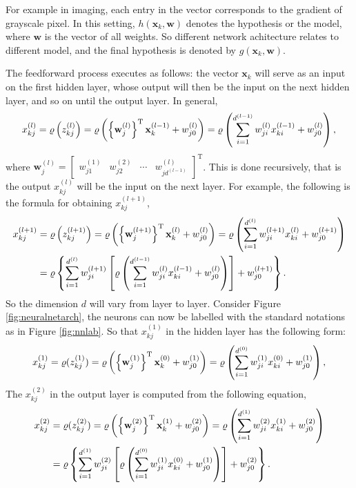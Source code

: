 For example in imaging, each entry in the vector corresponds to the gradient of grayscale pixel. In this setting, $h(\mathbf{x}_k,\mathbf{w})$ denotes the hypothesis or the model, where $\mathbf{w}$ is the vector of all weights. So different network achitecture relates to different model, and the final hypothesis is denoted by $g(\mathbf{x}_k,\mathbf{w})$. 

The feedforward process executes as follows: the vector $\mathbf{x}_k$ will serve as an input on the first hidden layer, whose output will then be the input on the next hidden layer, and so on until the output layer. In general,
$$
x_{kj}^{(l)}=\varrho\left(z_{kj}^{(l)}\right)=\varrho\left(\left\{\mathbf{w}_{j}^{(l)}\right\}^{\text{T}}\mathbf{x}_k^{(l-1)} + w_{j0}^{(l)}\right)=\varrho\left(\sum_{i=1}^{d^{(l-1)}}w_{ji}^{(l)}x_{ki}^{(l-1)}+w_{j0}^{(l)}\right),
$$
where $\mathbf{w}_{j}^{(l)}=\left[\begin{array}{cccc}w_{j1}^{(1)}&w_{j2}^{(2)}&\cdots&w_{jd^{(l-1)}}^{(l)}\end{array}\right]^{\text{T}}$. This is done recursively, that is the output $x_{kj}^{(l)}$ will be the input on the next layer. For example, the following is the formula for obtaining $x_{kj}^{(l+1)}$,
$$
\begin{aligned}
x_{kj}^{(l+1)}&=\varrho\left(z_{kj}^{(l+1)}\right)=\varrho\left(\left\{\mathbf{w}_{j}^{(l+1)}\right\}^{\text{T}}\mathbf{x}_k^{(l)} + w_{j0}^{(l)}\right)=\varrho\left(\sum_{i=1}^{d^{(l)}}w_{ji}^{(l+1)}x_{ki}^{(l)}+w_{j0}^{(l+1)}\right)\\
&=\varrho\left\{\sum_{i=1}^{d^{(l)}}w_{ji}^{(l+1)}\left[\varrho\left(\sum_{i=1}^{d^{(l-1)}}w_{ji}^{(l)}x_{ki}^{(l-1)}+w_{j0}^{(l)}\right)\right]+w_{j0}^{(l+1)}\right\}.
\end{aligned}
$$
So the dimension $d$ will vary from layer to layer. Consider Figure \ref{fig:neuralnetarch}, the neurons can now be labelled with the standard notations as in Figure \ref{fig:nnlab}.
So that $x_{kj}^{(1)}$ in the hidden layer has the following form:
$$
x_{kj}^{(1)}=\varrho(z_{kj}^{(1)})=\varrho\left(\left\{\mathbf{w}_{j}^{(1)}\right\}^{\text{T}}\mathbf{x}_k^{(0)} + w_{j0}^{(1)}\right)=\varrho\left(\sum_{i=1}^{d^{(0)}}w_{ji}^{(1)}x_{ki}^{(0)}+w_{j0}^{(1)}\right),
$$
The $x_{kj}^{(2)}$ in the output layer is computed from the following equation,
$$
\begin{aligned}
x_{kj}^{(2)}&=\varrho(z_{kj}^{(2)})=\varrho\left(\left\{\mathbf{w}_{j}^{(2)}\right\}^{\text{T}}\mathbf{x}_k^{(1)} + w_{j0}^{(2)}\right)=\varrho\left(\sum_{i=1}^{d^{(1)}}w_{ji}^{(2)}x_{ki}^{(1)}+w_{j0}^{(2)}\right)\\
&=\varrho\left\{\sum_{i=1}^{d^{(1)}}w_{ji}^{(2)}\left[\varrho\left(\sum_{i=1}^{d^{(0)}}w_{ji}^{(1)}x_{ki}^{(0)}+w_{j0}^{(1)}\right)\right]+w_{j0}^{(2)}\right\}.
\end{aligned}
$$

